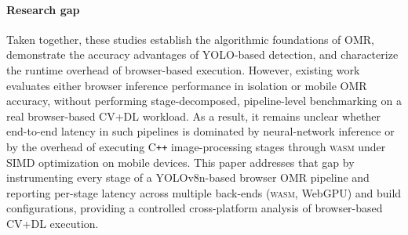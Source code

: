 \documentclass[conference]{IEEEtran}
\newcommand{\wasm}{\textsc{wasm}}
\begin{document}
\paragraph{Research gap}
Taken together, these studies establish the algorithmic foundations of OMR, demonstrate the accuracy advantages of YOLO-based detection, and characterize the runtime overhead of browser-based execution. However, existing work evaluates either browser inference performance in isolation or mobile OMR accuracy, without performing stage-decomposed, pipeline-level benchmarking on a real browser-based CV+DL workload.
As a result, it remains unclear whether end-to-end latency in such pipelines is dominated by neural-network inference or by the overhead of executing C\texttt{++} image-processing stages through \wasm{} under SIMD optimization on mobile devices.
This paper addresses that gap by instrumenting every stage of a YOLOv8n-based browser OMR pipeline and reporting per-stage latency across multiple back-ends (\wasm{}, WebGPU) and build configurations, providing a controlled cross-platform analysis of browser-based CV+DL execution.

\end{document}
